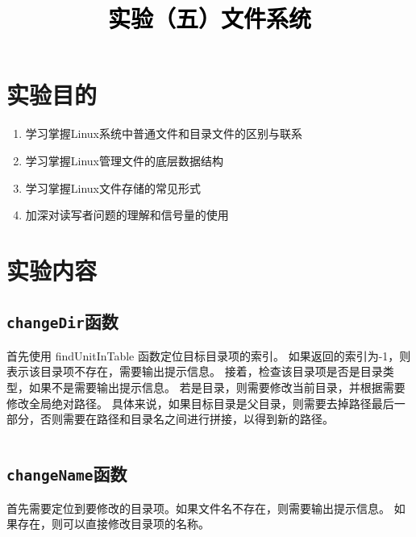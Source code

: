 \documentclass[a4paper,twoside]{article}
\newcommand{\PaperTitle}{实验（五）文件系统}  %
\begin{document}
\newpage

\title{
	\Large{\textcolor{black}{\PaperTitle}}
}

\maketitle
	
\tableofcontents
 
\newpage
\setcounter{page}{1}

\begin{spacing}{1.2}

\section{实验目的}

\begin{enumerate}
	\item 学习掌握Linux系统中普通文件和目录文件的区别与联系
	\item 学习掌握Linux管理文件的底层数据结构
	\item 学习掌握Linux文件存储的常见形式
	\item 加深对读写者问题的理解和信号量的使用
\end{enumerate}

\section{实验内容}

\subsection{\texttt{changeDir}函数}

首先使用 findUnitInTable 函数定位目标目录项的索引。
如果返回的索引为-1，则表示该目录项不存在，需要输出提示信息。
接着，检查该目录项是否是目录类型，如果不是需要输出提示信息。
若是目录，则需要修改当前目录，并根据需要修改全局绝对路径。
具体来说，如果目标目录是父目录，则需要去掉路径最后一部分，否则需要在路径和目录名之间进行拼接，以得到新的路径。

\inputminted[firstline=68,lastline=107]{cpp}{../code/File.cpp}

\subsection{\texttt{changeName}函数}

首先需要定位到要修改的目录项。如果文件名不存在，则需要输出提示信息。
如果存在，则可以直接修改目录项的名称。


\end{spacing}
\end{document}
